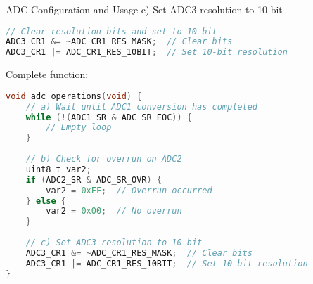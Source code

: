 \begin{example2}{ADC Configuration and Usage}
c) Set ADC3 resolution to 10-bit
\begin{lstlisting}[language=C, style=basesmol]
// Clear resolution bits and set to 10-bit
ADC3_CR1 &= ~ADC_CR1_RES_MASK;  // Clear bits
ADC3_CR1 |= ADC_CR1_RES_10BIT;  // Set 10-bit resolution
\end{lstlisting}

Complete function:
\begin{lstlisting}[language=C, style=basesmol]
void adc_operations(void) {
    // a) Wait until ADC1 conversion has completed
    while (!(ADC1_SR & ADC_SR_EOC)) {
        // Empty loop
    }
    
    // b) Check for overrun on ADC2
    uint8_t var2;
    if (ADC2_SR & ADC_SR_OVR) {
        var2 = 0xFF;  // Overrun occurred
    } else {
        var2 = 0x00;  // No overrun
    }
    
    // c) Set ADC3 resolution to 10-bit
    ADC3_CR1 &= ~ADC_CR1_RES_MASK;  // Clear bits
    ADC3_CR1 |= ADC_CR1_RES_10BIT;  // Set 10-bit resolution
}
\end{lstlisting}
\end{example2}